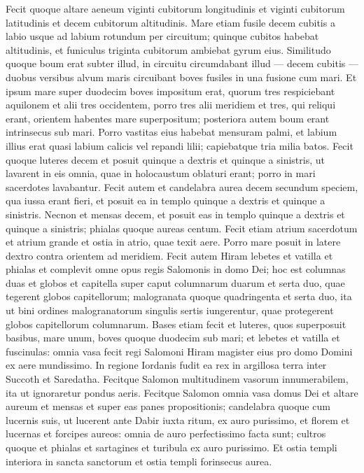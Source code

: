 \begin{biblechapter}
\begin{biblechapter}
\begin{biblechapter}
\begin{biblechapter}
\verse Fecit quoque altare aeneum viginti cubitorum longitudinis et viginti cubitorum latitudinis et decem cubitorum 
\verse altitudinis. Mare etiam fusile decem cubitis a labio usque ad labium rotundum per circuitum; quinque cubitos habebat altitudinis, et funiculus triginta cubitorum ambiebat gyrum eius. 
\verse Similitudo quoque boum erat subter illud, in circuitu circumdabant illud — decem cubitis — duobus versibus alvum maris circuibant boves fusiles in una fusione cum mari. 
\verse Et ipsum mare super duodecim boves impositum erat, quorum tres respiciebant aquilonem et alii tres occidentem, porro tres alii meridiem et tres, qui reliqui erant, orientem habentes mare superpositum; posteriora autem boum erant intrinsecus sub mari. 
\verse Porro vastitas eius habebat mensuram palmi, et labium illius erat quasi labium calicis vel repandi lilii; capiebatque tria milia batos.
 \verse Fecit quoque luteres decem et posuit quinque a dextris et quinque a sinistris, ut lavarent in eis omnia, quae in holocaustum oblaturi erant; porro in mari sacerdotes lavabantur.
 \verse Fecit autem et candelabra aurea decem secundum speciem, qua iussa erant fieri, et posuit ea in templo quinque a dextris et quinque a sinistris. 
\verse Necnon et mensas decem, et posuit eas in templo quinque a dextris et quinque a sinistris; phialas quoque aureas centum.
 \verse Fecit etiam atrium sacerdotum et atrium grande et ostia in atrio, quae texit aere. 
\verse Porro mare posuit in latere dextro contra orientem ad meridiem.
 \verse Fecit autem Hiram lebetes et vatilla et phialas et complevit omne opus regis Salomonis in domo Dei; 
\verse hoc est columnas duas et globos et capitella super caput columnarum duarum et serta duo, quae tegerent globos capitellorum; 
\verse malogranata quoque quadringenta et serta duo, ita ut bini ordines malogranatorum singulis sertis iungerentur, quae protegerent globos capitellorum columnarum. 
 \verse Bases etiam fecit et luteres, quos superposuit basibus, 
\verse mare unum, boves quoque duodecim sub mari; 
\verse et lebetes et vatilla et fuscinulas: omnia vasa fecit regi Salomoni Hiram magister eius pro domo Domini ex aere mundissimo. 
\verse In regione Iordanis fudit ea rex in argillosa terra inter Succoth et Saredatha. 
\verse Fecitque Salomon multitudinem vasorum innumerabilem, ita ut ignoraretur pondus aeris.
 \verse Fecitque Salomon omnia vasa domus Dei et altare aureum et mensas et super eas panes propositionis; 
\verse candelabra quoque cum lucernis suis, ut lucerent ante Dabir iuxta ritum, ex auro purissimo, 
\verse et florem et lucernas et forcipes aureos: omnia de auro perfectissimo facta sunt; 
\verse cultros quoque et phialas et sartagines et turibula ex auro purissimo. Et ostia templi interiora in sancta sanctorum et ostia templi forinsecus aurea.
 

\end{biblechapter}
\end{biblechapter}
\end{biblechapter}
\end{biblechapter}
